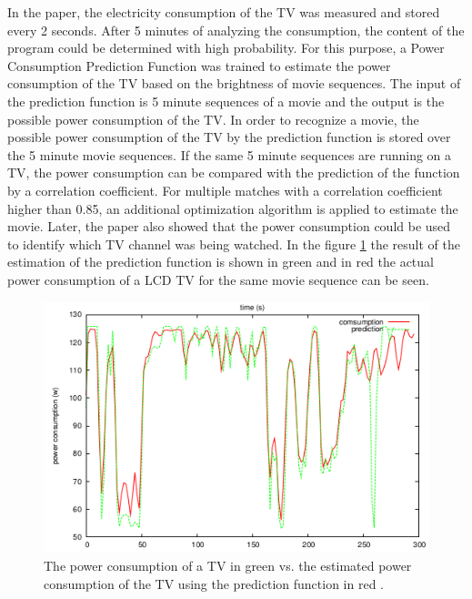 In the paper, the electricity consumption of the TV was measured and stored every 2 seconds. After 5 minutes of analyzing the consumption, the content of the program could be determined with high probability. For this purpose, a Power Consumption Prediction Function was trained to estimate the power consumption of the TV based on the brightness of movie sequences. 
The input of the prediction function is 5 minute sequences of a movie and the output is the possible power consumption of the TV. 
In order to recognize a movie, the possible power consumption of the TV by the prediction function is stored over the 5 minute movie sequences. If the same 5 minute sequences are running on a TV, the power consumption can be compared with the prediction of the function by a correlation coefficient. For multiple matches with a correlation coefficient higher than 0.85, an additional optimization algorithm is applied to estimate the movie. Later, the paper also showed that the power consumption could be used to identify which TV channel was being watched. In the figure \ref{fig:tv} the result of the estimation of the prediction function is shown in green and in red the actual power consumption of a LCD TV for the same movie sequence can be seen. 
\begin{figure}[tbp]
  \centering
  \includegraphics[width=1\textwidth]{images/Fernseher.png}
  \caption[Estimated power consumption of a TV]{The power consumption of a TV in green vs. the estimated power consumption of the TV using the prediction function in red \cite{greveler2012multimedia}.}
  \label{fig:tv}
\end{figure}
